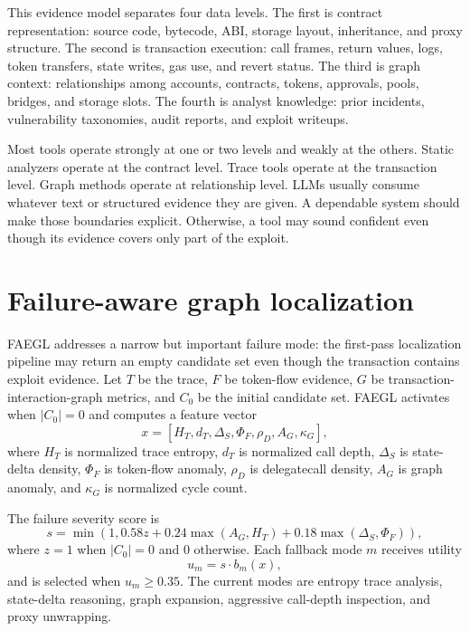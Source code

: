 \documentclass[conference]{IEEEtran}
\begin{document}
This evidence model separates four data levels. The first is contract representation: source code, bytecode, ABI, storage layout, inheritance, and proxy structure. The second is transaction execution: call frames, return values, logs, token transfers, state writes, gas use, and revert status. The third is graph context: relationships among accounts, contracts, tokens, approvals, pools, bridges, and storage slots. The fourth is analyst knowledge: prior incidents, vulnerability taxonomies, audit reports, and exploit writeups.

Most tools operate strongly at one or two levels and weakly at the others. Static analyzers operate at the contract level. Trace tools operate at the transaction level. Graph methods operate at relationship level. LLMs usually consume whatever text or structured evidence they are given. A dependable system should make those boundaries explicit. Otherwise, a tool may sound confident even though its evidence covers only part of the exploit.

\section{Failure-aware graph localization}

FAEGL addresses a narrow but important failure mode: the first-pass localization pipeline may return an empty candidate set even though the transaction contains exploit evidence. Let $T$ be the trace, $F$ be token-flow evidence, $G$ be transaction-interaction-graph metrics, and $C_0$ be the initial candidate set. FAEGL activates when $|C_0|=0$ and computes a feature vector
\begin{equation}
x=[H_T, d_T, \Delta_S, \Phi_F, \rho_D, A_G, \kappa_G],
\end{equation}
where $H_T$ is normalized trace entropy, $d_T$ is normalized call depth, $\Delta_S$ is state-delta density, $\Phi_F$ is token-flow anomaly, $\rho_D$ is delegatecall density, $A_G$ is graph anomaly, and $\kappa_G$ is normalized cycle count.

The failure severity score is
\begin{equation}
s=\min(1,0.58z+0.24\max(A_G,H_T)+0.18\max(\Delta_S,\Phi_F)),
\end{equation}
where $z=1$ when $|C_0|=0$ and $0$ otherwise. Each fallback mode $m$ receives utility
\begin{equation}
u_m=s\cdot b_m(x),
\end{equation}
and is selected when $u_m\geq0.35$. The current modes are entropy trace analysis, state-delta reasoning, graph expansion, aggressive call-depth inspection, and proxy unwrapping.
\end{document}
